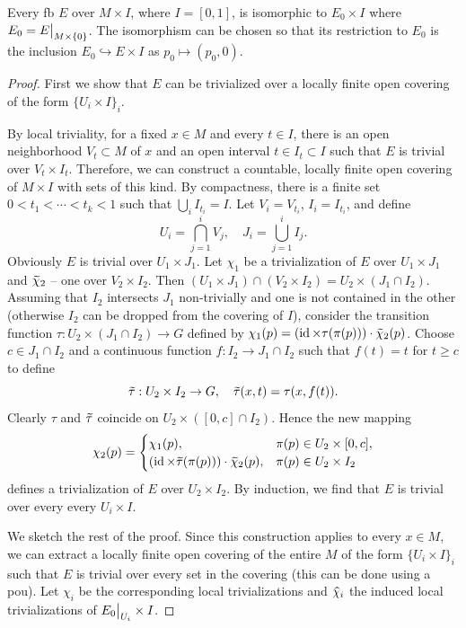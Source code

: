 \begin{thm}\label{bundles over MxI}
    Every \gls{fb} $E$ over $M\times I$, where $I=[0,1]$, is isomorphic to $E_0\times I$ where $E_0=\restr{E}{M\times\{0\}}$. The isomorphism can be chosen so that its restriction to $E_0$ is the inclusion $E_0\hookrightarrow E\times I$ as $p_0\mapsto (p_0,0)$.
\end{thm}
\begin{proof}
    First we show that $E$ can be trivialized over a locally finite open covering of the form $\{U_i\times I\}_i$.

    By local triviality, for a fixed $x\in M$ and every $t\in I$, there is an open neighborhood $V_t\subset M$ of $x$ and an open interval $t\in I_t\subset I$ such that $E$ is trivial over $V_t\times I_t$. Therefore, we can construct a countable, locally finite open covering of $M\times I$ with sets of this kind. By compactness, there is a finite set $0<t_1<\cdots<t_k<1$ such that $\bigcup_i I_{t_i}=I$. Let $V_i=V_{t_i}$, $I_i=I_{t_i}$, and define 
    \[
        U_i=\bigcap_{j=1}^i V_j,\quad J_i=\bigcup_{j=1}^i I_j.
    \]
    Obviously $E$ is trivial over $U_1\times J_1$. Let $\chi_1$ be a trivialization of $E$ over $U_1\times J_1$ and $\wt{\chi}_2$ -- one over $V_2\times I_2$. Then $(U_1\times J_1)\cap (V_2\times I_2)=U_2\times (J_1\cap I_2)$. Assuming that $I_2$ intersects $J_1$ non-trivially and one is not contained in the other (otherwise $I_2$ can be dropped from the covering of $I$), consider the transition function $\tau:U_2\times(J_1\cap I_2)\to G$ defined by $\chi_1(p)=\left(\id\times    \tau(\pi(p))\right)\cdot \wt{\chi}_2(p)$. Choose $c\in J_1\cap I_2$ and a continuous function $f:I_2\to J_1\cap I_2$ such that $f(t)=t$ for $t\geq c$ to define 
    \[
        \wt{\tau}:U_2\times I_2\to G,\quad \wt{\tau}(x,t)=\tau(x,f(t)).
    \]
    Clearly $\tau$ and $\wt{\tau}$ coincide on $U_2\times([0,c]\cap I_2)$. Hence the new mapping
    \[
    \chi_2(p)=\begin{cases}
    \chi_1(p), & \pi(p)\in U_2\times[0,c],\\
    (\id\times\wt{\tau}(\pi(p)))\cdot \wt{\chi}_2(p), & \pi(p)\in U_2\times I_2
    \end{cases}
    \]
    defines a trivialization of $E$ over $U_2\times I_2$. By induction, we find that $E$ is trivial over every every $U_i\times I$. 

    We sketch the rest of the proof. Since this construction applies to every $x\in M$, we can extract a locally finite open covering of the entire $M$ of the form $\{U_i\times I\}_i$ such that $E$ is trivial over every set in the covering (this can be done using a \gls{pou}). Let $\chi_i$ be the corresponding local trivializations and $\wh{\chi}_i$ the induced local trivializations of $\restr{E_0}{U_i}\times I$.


\end{proof}
